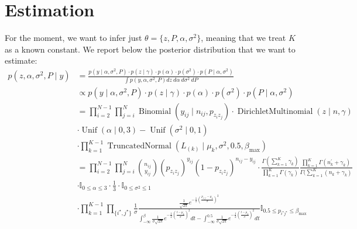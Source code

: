 \documentclass[11pt]{amsart}
\begin{document}
\clearpage

\section{Estimation}

For the moment, we want to infer just $\theta = \{ z, P, \alpha, \sigma^2 \}$, meaning that we treat $K$ as a known constant. We report below the posterior distribution that we want to estimate:
\begin{align}\label{eqn:general_posterior}
p(z,\alpha,\sigma^2,P\mid y) &= \frac{p( y \mid \alpha,\sigma^2,P) \cdot p(z \mid \gamma) \cdot p(\alpha)  \cdot p(\sigma^2) \cdot p(P \mid \alpha, \sigma^2) }{\int p( y, \alpha,\sigma^2,P) dz \ d\alpha \ d\sigma^2 \ dP} \nonumber \\
&\propto p( y \mid \alpha,\sigma^2,P)  \cdot p(z \mid \gamma) \cdot p(\alpha)  \cdot p(\sigma^2) \cdot p(P \mid \alpha, \sigma^2) \nonumber\\
&= \prod_{i =2 }^{N-1} \prod_{j =i}^{N} \operatorname{Binomial}\left(y_{ij} \mid n_{ij}, p_{z_i z_j} \right)  \cdot \operatorname{DirichletMultinomial} \left(z \mid n,\gamma \right) \nonumber\\
&\cdot \operatorname{Unif}\left(\alpha \mid 0, 3\right) - \operatorname{Unif} \left( \sigma^{2} \mid 0, 1\right) \nonumber \\
&\cdot \prod_{k=1}^{K-1} \operatorname{TruncatedNormal}\left( L_{(k)} \mid \mu_k, \sigma^{2}, 0.5, \beta_{\max} \right) \nonumber \\
&= \prod_{i =2 }^{N-1} \prod_{j =i}^{N} \binom{n_{ij}}{y_{ij}} (p_{z_i z_j})^{y_{ij}}(1 - p_{z_i z_j})^{n_{ij} - y_{ij}} \cdot \frac{\Gamma(\sum_{k=1}^K \gamma_k)}{\prod_{k=1}^K \Gamma(\gamma_k)}\frac{\prod_{k=1}^K \Gamma(n^{\prime}_k+\gamma_k)}{\Gamma(\sum_{k=1}^K (n_k+\gamma_k)}  \\
&\cdot \mathbb{I}_{0 \leq \alpha \leq 3} \cdot \frac{1}{3} \cdot \mathbb{I}_{0 \leq \sigma^2 \leq 1} \nonumber  \nonumber \\
&\cdot \prod_{k=1}^{K-1} \prod_{\{i^\star, j^\star\}}  \frac{1}{\sigma} \frac{\frac{1}{\sqrt{2\pi}} e^{-\frac{1}{2}\left(\frac{p_{i^\star j^\star} -  \mu_k}{\sigma}\right)^2}}{\int_{-\infty}^\beta \frac{1}{\sigma\sqrt{2\pi}} e^{-\frac{1}{2}\left(\frac{t-  \mu_k}{\sigma}\right)^2 }dt -\int_{-\infty}^{0.5} \frac{1}{\sigma\sqrt{2\pi}} e^{-\frac{1}{2}\left(\frac{t-  \mu_k}{\sigma}\right)^2 }dt}  \mathbb{I}_{0.5 \leq p_{i^\star j^\star} \leq \beta_{\max}}\nonumber
\end{align}
\end{document}
